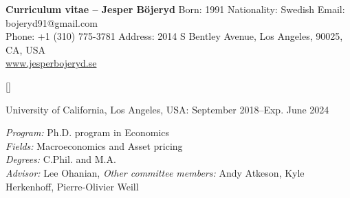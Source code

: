 \documentclass[a4paper,
10pt]{article}
\renewcommand{\section}[1]{\vspace*{6pt}\marginnote{\raggedright\bfseries{\scshape{#1}}}[\parskip]}
\renewcommand{\year}[1]{\hfill#1\ignorespaces}
\newenvironment{lista}{\vspace*{-9pt}\begin{adjustwidth}{24pt}{0pt}}{\end{adjustwidth}\vspace*{-9pt}}
\begin{document}
\begin{adjustwidth}{-1.2in}{0in} %
\begin{center}
{\Large \textbf{Curriculum vitae -- Jesper Böjeryd}}
\noindent\makebox[\linewidth]{\rule{\linewidth}{1pt}} %
Born: 1991 \hspace{6pt} Nationality: Swedish \hspace{6pt} Email: bojeryd91@gmail.com \\
Phone: +1 (310) 775-3781 \hspace{6pt} Address: 2014 S Bentley Avenue, Los Angeles, 90025, CA, USA \\
\url{www.jesperbojeryd.se}
\end{center}
\end{adjustwidth}

\section{EDUCATION}

University of California, Los Angeles, USA: \year{September 2018--Exp. June 2024}
\begin{lista}
\emph{Program:} Ph.D. program in Economics \\
\emph{Fields:} Macroeconomics and Asset pricing\\
\emph{Degrees:} C.Phil. and M.A.\\
\emph{Advisor:} Lee Ohanian, \emph{Other committee members:} Andy Atkeson, Kyle Herkenhoff, Pierre-Olivier Weill
\end{lista}
\end{document}
